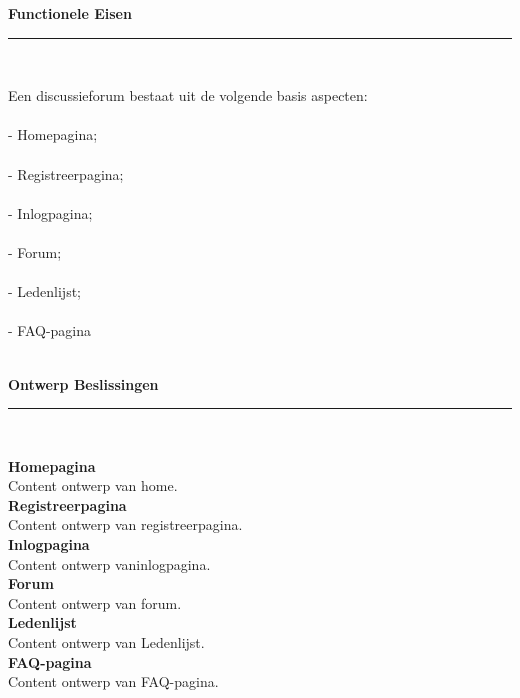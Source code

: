 \documentclass[a4paper,12pt]{article}
\newcommand{\HRule}{\rule{\linewidth}{0.5mm}}
\begin{document}
\newpage
\begin{center}
{ \LARGE \bfseries Functionele Eisen}\\[0.1cm]
\HRule \\[0.5cm]
\end{center}
Een discussieforum bestaat uit de volgende basis aspecten:\\\\
-	Homepagina;\\\\
-	Registreerpagina;\\\\
-	Inlogpagina;\\\\
-	Forum;\\\\
-	Ledenlijst;\\\\
-	FAQ-pagina\\\\




\newpage
\begin{center}
{ \LARGE \bfseries Ontwerp Beslissingen}\\[0.1cm]
\HRule \\[0.5cm]
\end{center}
{\bfseries Homepagina} \\
Content ontwerp van home.\\



{\bfseries Registreerpagina}\\
Content ontwerp van registreerpagina.\\

{\bfseries Inlogpagina}\\
Content ontwerp vaninlogpagina.\\


{\bfseries Forum}\\
Content ontwerp van forum.\\


{\bfseries Ledenlijst}\\
Content ontwerp van Ledenlijst.\\


{\bfseries FAQ-pagina}\\
Content ontwerp van FAQ-pagina.\\
\end{document}
